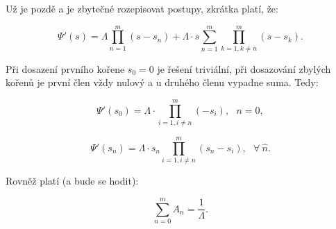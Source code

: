 Už je pozdě a je zbytečné rozepisovat postupy, zkrátka platí, že:

$$ \Psi'(s) = \Lambda \prod_{n=1}^m (s-s_n) + \Lambda \cdot s \sum_{n=1}^m \prod_{k=1, k \neq n}^m (s-s_k). $$

Při dosazení prvního kořene $s_0 = 0$ je řešení triviální, při dosazování zbylých kořenů je první člen vždy nulový a u druhého členu vypadne suma. Tedy:

$$ \Psi'(s_0) = \Lambda \cdot \prod_{i=1, i \neq n}^m (-s_i), \: \: \: n = 0, $$

$$ \Psi'(s_n) = \Lambda \cdot s_n \prod_{i=1, i \neq n}^m (s_n-s_i), \: \: \: \forall \: \widehat{n}. $$

Rovněž platí (a bude se hodit):

$$ \sum_{n=0}^m A_n = \dfrac{1}{\Lambda}. $$
